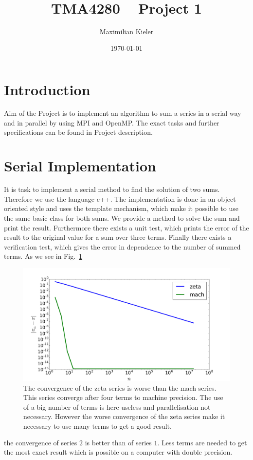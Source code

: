 







\title{TMA4280 -- Project 1}
\author{Maximilian Kieler}
\date{\today}

\maketitle


\section{Introduction}

Aim of the Project is to implement an algorithm to sum a series in a serial way and in parallel by using MPI and OpenMP. The exact tasks and further specifications can be found in Project description. 




\section{Serial Implementation}

It is task to implement a serial method to find the solution of two sums. Therefore we use the language c++. The implementation is done in an object oriented style and uses the template mechanism, which make it possible to use the same basic class for both sums. We provide a method to solve the sum and print the result. Furthermore there exists a unit test, which prints the error of the result to the original value for a sum over three terms. Finally there exists a verification test, which gives the error in dependence to the number of summed terms. As we see in Fig.~\ref{fig:convergence_series}\begin{figure}[h] 
  \centering
     \includegraphics[width=\textwidth]{pic/convergence_series.png}
  \caption{The convergence of the zeta series is worse than the mach series. This series converge after four terms to machine precision. The use of a big number of terms is here useless and parallelisation not necessary. However the worse convergence of the zeta series make it necessary to use many terms to get a good result.}
  \label{fig:convergence_series}
\end{figure} the convergence of series $2$ is better than of series $1$. Less terms are needed to get the most exact result which is possible on a computer with double precision. 






